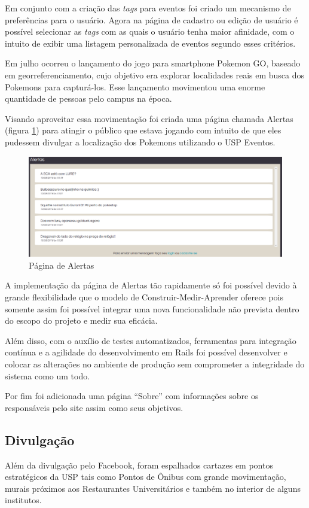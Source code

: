 \par Em conjunto com a criação das \emph{tags} para eventos foi criado um mecanismo de preferências para o usuário. Agora na página de cadastro ou edição de usuário é possível selecionar as \emph{tags} com as quais o usuário tenha maior afinidade, com o intuito de exibir uma listagem personalizada de eventos segundo esses critérios.
\par Em julho ocorreu o lançamento do jogo para smartphone Pokemon GO, baseado em georreferenciamento, cujo objetivo era explorar localidades reais em busca dos
Pokemons para capturá-los. Esse lançamento movimentou uma enorme quantidade de pessoas pelo campus na época.
\par Visando aproveitar essa movimentação foi criada uma página chamada Alertas (figura \ref{fig:alert_page}) para atingir o público que estava jogando com intuito de que eles pudessem divulgar a localização dos Pokemons utilizando o USP Eventos.
\begin{figure}[htb]
\centering
\includegraphics[width=15cm]{figuras/alert_page}
\centering
\caption{\label{fig:alert_page} Página de Alertas}
\end{figure}
\par A implementação da página de Alertas tão rapidamente só foi possível devido à grande flexibilidade que o modelo de Construir-Medir-Aprender oferece pois somente assim foi possível integrar uma nova funcionalidade não prevista dentro do escopo do projeto e medir sua eficácia.
\par Além disso, com o auxílio de testes automatizados, ferramentas para integração contínua e a agilidade do desenvolvimento em Rails foi possível desenvolver e colocar as alterações no ambiente de produção sem comprometer a integridade do sistema como um todo.
\par Por fim foi adicionada uma página ``Sobre'' com informações sobre os responsáveis pelo site assim como seus objetivos.
\subsection{Divulgação}
\par Além da divulgação pelo Facebook, foram espalhados cartazes em pontos estratégicos da USP tais como Pontos de Ônibus com grande movimentação, murais próximos aos Restaurantes Universitários e também no interior de alguns institutos.

